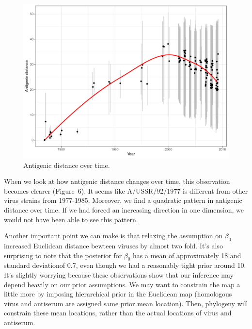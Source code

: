 \documentclass[12pt]{article}
\begin{document}
\begin{figure}
\includegraphics[width=\textwidth]{../figure/h1n1_distance_relax.pdf}
\caption{
Antigenic distance over time.
}
\end{figure}

When we look at how antigenic distance changes over time, this observation becomes clearer (Figure~6).
It seems like  A/USSR/92/1977 is different from other virus strains from 1977-1985.
Moreover, we find a quadratic pattern in antigenic distance over time.
If we had forced an increasing direction in one dimension, we would not have been able to see this pattern.

Another important point we can make is that relaxing the assumption on $\beta_0$ increased Euclidean distance bewteen viruses by almost two fold. 
It's also surprising to note that the posterior for $\beta_0$ has a mean of approximately 18 and standard deviationof 0.7, even though we had a reasonably tight prior around 10. 
It's slightly worrying because these observations show that our inference may depend heavily on our prior assumptions.
We may want to constrain the map a little more by imposing hierarchical prior in the Euclidean map (homologous virus and antiserum are assigned same prior mean location). Then, phylogeny will constrain these mean locations, rather than the actual locations of virus and antiserum.
\end{document}
